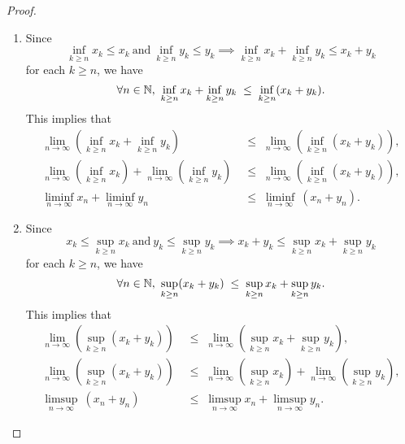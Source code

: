 \documentclass[11pt,openany]{article}
\begin{document}
\begin{proof}
\begin{enumerate}[(1)]
	\item Since \[
	\inf\limits_{k\geq n}x_k\leq x_k\ \text{and}\ \inf\limits_{k\geq n}y_k\leq y_k\implies
	\inf\limits_{k\geq n}x_k+\inf\limits_{k\geq n}y_k\leq x_k+ y_k
	\] for each $k\geq n$, we have \[
	\forall n\in\mathbb{N},\ \inf\limits_{k\geq n}x_k+\inf\limits_{k\geq n}y_k \;\leq\; \inf\limits_{k\geq n}(x_k+y_k).
	\] This implies that \begin{align*}
		\lim\limits_{n \to \infty}\left(\inf\limits_{k\geq n}x_k+\inf\limits_{k\geq n}y_k\right) \;&\leq\; \lim\limits_{n \to \infty}\left(\inf\limits_{k\geq n}(x_k+y_k)\right),\\
		\lim\limits_{n \to \infty}\left(\inf\limits_{k\geq n}x_k\right)+\lim\limits_{n \to \infty}\left(\inf\limits_{k\geq n}y_k\right) \;&\leq\; \lim\limits_{n \to \infty}\left(\inf\limits_{k\geq n}(x_k+y_k)\right),\\
		\liminf\limits_{n \to \infty}x_n+\liminf\limits_{n \to \infty}y_n \;&\leq\; \liminf\limits_{n \to \infty}\ (x_n+y_n).
	\end{align*}
	\item Since \[
	x_k\leq \sup\limits_{k\geq n}x_k\ \text{and}\ y_k\leq \sup\limits_{k\geq n}y_k\implies
	x_k+ y_k\leq\sup\limits_{k\geq n}x_k+\sup\limits_{k\geq n}y_k 
	\] for each $k\geq n$, we have \[
	\forall n\in\mathbb{N},\ \sup\limits_{k\geq n}(x_k+y_k) \;\leq\; \sup\limits_{k\geq n}x_k+\sup\limits_{k\geq n}y_k.
	\] This implies that \begin{align*}
		\lim\limits_{n \to \infty}\left(\sup\limits_{k\geq n}(x_k+y_k)\right) \;&\leq\; \lim\limits_{n \to \infty}\left(\sup\limits_{k\geq n}x_k+\sup\limits_{k\geq n}y_k\right),\\
		\lim\limits_{n \to \infty}\left(\sup\limits_{k\geq n}(x_k+y_k)\right) \;&\leq\; \lim\limits_{n \to \infty}\left(\sup\limits_{k\geq n}x_k\right)+\lim\limits_{n \to \infty}\left(\sup\limits_{k\geq n}y_k\right),\\
		\limsup\limits_{n \to \infty}\ (x_n+y_n) \;&\leq\; \limsup\limits_{n \to \infty} x_n + \limsup\limits_{n \to \infty} y_n.
	\end{align*}
\end{enumerate}
\end{proof}
\end{document}
